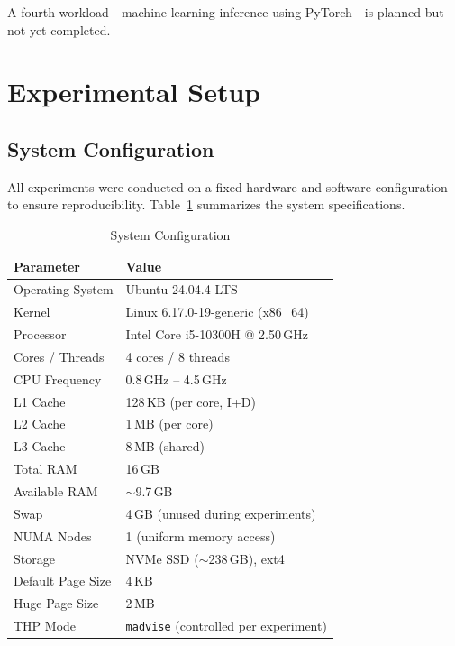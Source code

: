 \documentclass[conference]{IEEEtran}
\begin{document}
A fourth workload---machine learning inference using PyTorch---is planned but not yet completed.

\section{Experimental Setup}

\subsection{System Configuration}

All experiments were conducted on a fixed hardware and software configuration to ensure reproducibility. Table~\ref{tab:system} summarizes the system specifications.

\begin{table}[H]
\centering
\caption{System Configuration}
\label{tab:system}
\begin{tabular}{@{}ll@{}}
\toprule
\textbf{Parameter} & \textbf{Value} \\
\midrule
Operating System & Ubuntu 24.04.4 LTS \\
Kernel & Linux 6.17.0-19-generic (x86\_64) \\
Processor & Intel Core i5-10300H @ 2.50\,GHz \\
Cores / Threads & 4 cores / 8 threads \\
CPU Frequency & 0.8\,GHz -- 4.5\,GHz \\
L1 Cache & 128\,KB (per core, I+D) \\
L2 Cache & 1\,MB (per core) \\
L3 Cache & 8\,MB (shared) \\
Total RAM & 16\,GB \\
Available RAM & $\sim$9.7\,GB \\
Swap & 4\,GB (unused during experiments) \\
NUMA Nodes & 1 (uniform memory access) \\
Storage & NVMe SSD ($\sim$238\,GB), ext4 \\
Default Page Size & 4\,KB \\
Huge Page Size & 2\,MB \\
THP Mode & \texttt{madvise} (controlled per experiment) \\
\bottomrule
\end{tabular}
\end{table}
\end{document}
